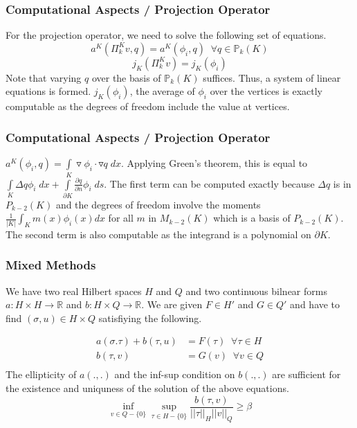 \documentclass{beamer}
\def\R{\mathbb{R}}
\def\R{\mathbb{R}}
\begin{document}
\begin{frame}
\frametitle{Computational Aspects / Projection Operator}
For the projection operator, we need to solve the following set of equations.
$$ a^K(\Pi_k^Kv,q)=a^K(\phi_i,q)\;\;\forall q \in \mathbb{P}_k(K) $$
$$ j_K(\Pi_k^Kv)=j_K(\phi_i) $$
Note that varying $q$ over the basis of $\mathbb{P}_k(K)$ suffices. Thus, a system of linear equations is formed.
\linebreak\linebreak
$j_K(\phi_i)$, the average of $\phi_i$ over the vertices is exactly computable as the degrees of freedom include the value at vertices.
\end{frame}
\begin{frame}
\frametitle{Computational Aspects / Projection Operator}
$a^K(\phi_i,q)=\int\limits_{K}\triangledown \phi_i \cdot \triangledown q \;dx$.
\linebreak
Applying Green's theorem, this is equal to $\int\limits_{K} \Delta q \phi_i\;dx + \int\limits_{\partial K}\frac{\partial q}{\partial n} \phi_i\;ds$.
\linebreak\linebreak
The first term can be computed exactly because $\Delta q$ is in ${P}_{k-2}(K)$ and the degrees of freedom involve the moments $\frac{1}{|K|}\int_K m(x) \phi_i(x) dx$ for all $m$ in $ M_{k-2}(K)$ which is a basis of ${P}_{k-2}(K)$.
\linebreak\linebreak
The second term is also computable as the integrand is a polynomial on $\partial K$.
\end{frame}

\frame
{
	\frametitle{Mixed Methods}
	We have two real Hilbert spaces $H$ and $Q$ and two continuous bilnear forms $a:H\times H\to\R$ and $b:H\times Q \to \R$. We are given $F\in H'$ and $G\in Q'$ and have to find $(\sigma,u)\in H\times Q$ satisfiying the following.

\begin{equation*}
\begin{split}
a(\sigma . \tau)+b(\tau , u) & = F(\tau) \;\; \forall \tau \in H \\
b(\tau,v) & =G(v) \;\; \forall v \in Q \\
\end{split}
\end{equation*}
The ellipticity of $a(.,.)$ and the inf-sup condition on $b(.,.)$ are sufficient for the existence and uniquness of the solution of the above equations.
\begin{equation*}
\inf\limits_{v\in Q-\{0\}} \sup\limits_{\tau\in H-\{0\}} \frac{b(\tau,v)}{||\tau||_H||v||_Q} \ge \beta
\end{equation*}
}
\end{document}
